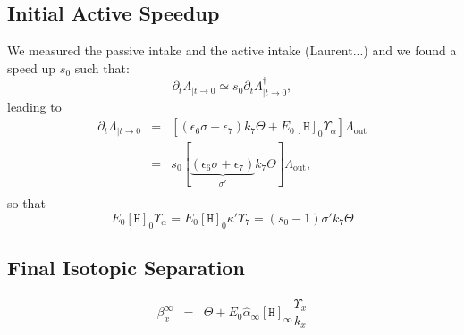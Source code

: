 \documentclass[aps,onecolumn,11pt]{revtex4}
\newcommand{\mychem}[1]{\mathtt{#1}}
\newcommand{\myconc}[1]{\left\lbrack{#1}\right\rbrack}
\newcommand{\spproton}{\mychem{H}}
\newcommand{\proton}{\myconc{\spproton}}
\newcommand{\LiAll}{\Lambda}
\newcommand{\LiAllOut}{{\LiAll}_{\mathrm{out}}}
\newcommand{\ko}{\dagger}
\begin{document}
\subsection{Initial Active Speedup}
We measured the passive intake and the active intake (Laurent...)
and we found a speed up $s_0$ such that:
\begin{equation}
	\partial_t \Lambda_{\vert t\to0} \simeq s_0 \partial_t \Lambda^\ko_{\vert t\to0},
\end{equation}
leading to
\begin{equation}
\begin{array}{rcl}
	\partial_t \Lambda_{\vert t\to0} & = & \left[ (\epsilon_6 \sigma + \epsilon_7) k_7 \Theta + E_0 \proton_0 \Upsilon_\alpha \right] \LiAllOut \\
	& = & s_0 \left[  \underbrace{(\epsilon_6 \sigma + \epsilon_7)}_{\sigma'} k_7 \Theta \right] \LiAllOut,\\
\end{array}	
\end{equation}
so that
\begin{equation}
\label{eq:speedup}
	E_0 \proton_0 \Upsilon_\alpha = E_0 \proton_0 \kappa' \Upsilon_7 = (s_0-1)   \sigma' k_7 \Theta 
\end{equation}

\subsection{Final Isotopic Separation}
\begin{equation}
\label{eq:inf}
\begin{array}{rcl}
	\beta_x^\infty & = &\Theta + E_0 \hat\alpha_\infty \proton_\infty \dfrac{\Upsilon_x}{k_x}\\
\end{array}
\end{equation}
\end{document}
